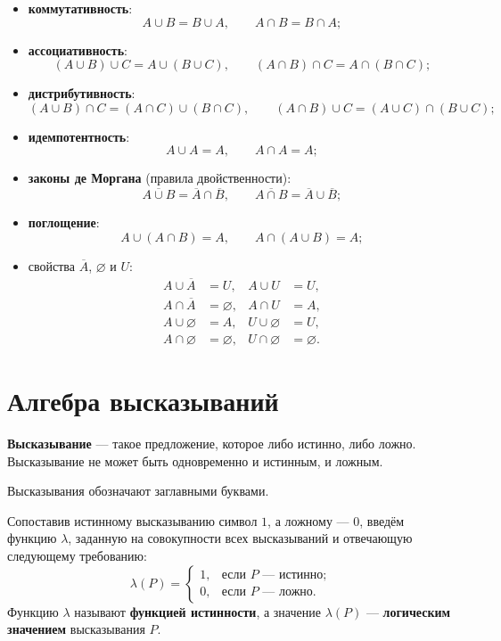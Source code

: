 \documentclass[a4paper,11pt]{article}
\begin{document}
\begin{itemize}
  \item \textbf{коммутативность}:
    \[ A \cup B = B \cup A, \qquad A \cap B = B \cap A; \]
  \item \textbf{ассоциативность}:
    \[ (A \cup B) \cup C = A \cup (B \cup C), \qquad
       (A \cap B) \cap C = A \cap (B \cap C); \]
  \item \textbf{дистрибутивность}:
    \[ (A \cup B) \cap C = (A \cap C) \cup (B \cap C), \qquad
       (A \cap B) \cup C = (A \cup C) \cap (B \cup C); \]
  \item \textbf{идемпотентность}:
    \[ A \cup A = A, \qquad A \cap A = A; \]
  \item \textbf{законы де Моргана} (правила двойственности):
    \[ \overline{A \cup B} = \overline{A} \cap \overline{B}, \qquad
       \overline{A \cap B} = \overline{A} \cup \overline{B}; \]
  \item \textbf{поглощение}:
    \[ A \cup (A \cap B) = A, \qquad A \cap (A \cup B) = A; \]
  \item свойства $\overline{A}$, $\varnothing$ и $U$: %
    \[
      \begin{aligned}
        A \cup \overline{A} &= U, & A \cup U &= U, \\
        A \cap \overline{A} &= \varnothing, & A \cap U &= A, \\
        A \cup \varnothing &= A, & U \cup \varnothing &= U, \\
        A \cap \varnothing &= \varnothing, & U \cap \varnothing &= \varnothing.
      \end{aligned}
    \]
\end{itemize}

\section{Алгебра высказываний}

\textbf{Высказывание} --- такое предложение, которое либо истинно, либо ложно.
Высказывание не может быть одновременно и истинным, и ложным.

Высказывания обозначают заглавными буквами.

Сопоставив истинному высказыванию символ $1$, а ложному --- $0$, введём
функцию $\lambda$, заданную на совокупности всех высказываний и отвечающую
следующему требованию:
\[
  \lambda(P) =
  \begin{cases}
    1, & \text{если } P \text{ --- истинно};\\
    0, & \text{если } P \text{ --- ложно}.
  \end{cases}
\]
Функцию $\lambda$ называют \textbf{функцией истинности}, а значение
$\lambda(P)$ --- \textbf{логическим значением} высказывания $P$.
\end{document}
